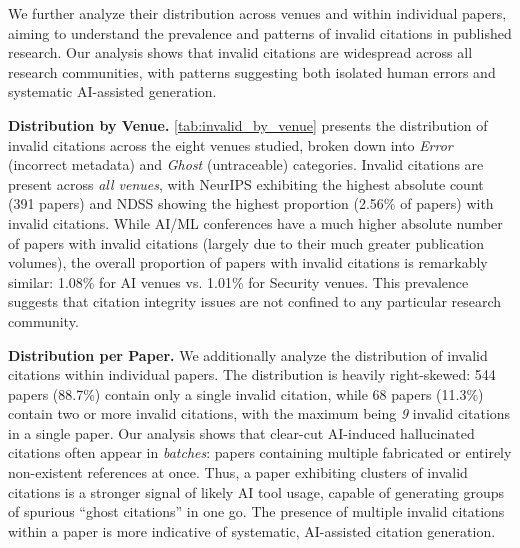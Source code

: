We further analyze their distribution across venues and within individual papers, aiming to understand the prevalence and patterns of invalid citations in published research.
Our analysis shows that invalid citations are widespread across all research communities, with patterns suggesting both isolated human errors and systematic AI-assisted generation.



\noindent\textbf{Distribution by Venue.}
\cref{tab:invalid_by_venue} presents the distribution of invalid citations across the eight venues studied, broken down into \textit{Error} (incorrect metadata) and \textit{Ghost} (untraceable) categories.
Invalid citations are present across \textit{all venues}, with NeurIPS exhibiting the highest absolute count (391 papers) and NDSS showing the highest proportion (2.56\% of papers) with invalid citations. 
While AI/ML conferences have a much higher absolute number of papers with invalid citations (largely due to their much greater publication volumes), the overall proportion of papers with invalid citations is remarkably similar: 1.08\% for AI venues vs. 1.01\% for Security venues. 
This prevalence suggests that citation integrity issues are not confined to any particular research community.

\noindent
\textbf{Distribution per Paper.}
We additionally analyze the distribution of invalid citations within individual papers.
The distribution is heavily right-skewed: 544 papers (88.7\%) contain only a single invalid citation, while 68 papers (11.3\%) contain two or more invalid citations, with the maximum being \textit{9} invalid citations in a single paper.
Our analysis shows that clear-cut AI-induced hallucinated citations often appear in \emph{batches}: papers containing multiple fabricated or entirely non-existent references at once. 
Thus, a paper exhibiting clusters of invalid citations is a stronger signal of likely AI tool usage, capable of generating groups of spurious ``ghost citations'' in one go. The presence of multiple invalid citations within a paper is more indicative of systematic, AI-assisted citation generation.


